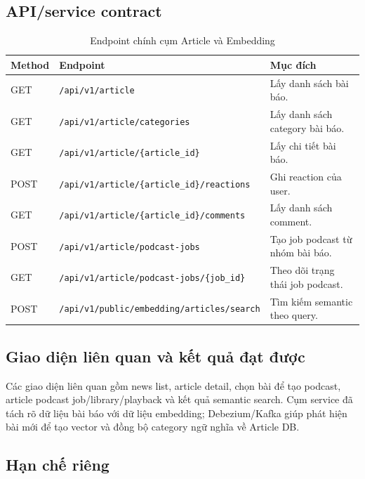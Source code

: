 \documentclass[14pt,a4paper,oneside]{extreport}
\begin{document}
\subsection{API/service contract}

\begin{table}[H]
\centering
\caption{Endpoint chính cụm Article và Embedding}
\label{tab:endpoint-article-embedding}
\renewcommand{\arraystretch}{1.3}
\scriptsize
\begin{tabularx}{\textwidth}{|l|l|X|}
\hline
\textbf{Method} & \textbf{Endpoint} & \textbf{Mục đích} \\
\hline
GET & \texttt{/api/v1/article} & Lấy danh sách bài báo. \\
\hline
GET & \texttt{/api/v1/article/categories} & Lấy danh sách category bài báo. \\
\hline
GET & \texttt{/api/v1/article/\{article\_id\}} & Lấy chi tiết bài báo. \\
\hline
POST & \texttt{/api/v1/article/\{article\_id\}/reactions} & Ghi reaction của user. \\
\hline
GET & \texttt{/api/v1/article/\{article\_id\}/comments} & Lấy danh sách comment. \\
\hline
POST & \texttt{/api/v1/article/podcast-jobs} & Tạo job podcast từ nhóm bài báo. \\
\hline
GET & \texttt{/api/v1/article/podcast-jobs/\{job\_id\}} & Theo dõi trạng thái job podcast. \\
\hline
POST & \texttt{/api/v1/public/embedding/articles/search} & Tìm kiếm semantic theo query. \\
\hline
\end{tabularx}
\end{table}

\subsection{Giao diện liên quan và kết quả đạt được}

Các giao diện liên quan gồm news list, article detail, chọn bài để tạo podcast, article podcast job/library/playback và kết quả semantic search. Cụm service đã tách rõ dữ liệu bài báo với dữ liệu embedding; Debezium/Kafka giúp phát hiện bài mới để tạo vector và đồng bộ category ngữ nghĩa về Article DB.

\subsection{Hạn chế riêng}
\end{document}
